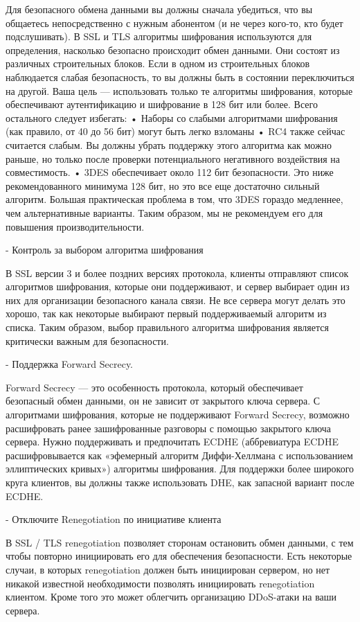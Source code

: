 \documentclass[10pt,a4paper]{article}
\begin{document}
Для безопасного обмена данными вы должны сначала убедиться, что вы общаетесь непосредственно с нужным абонентом (и не через кого-то, кто будет подслушивать). В SSL и TLS алгоритмы шифрования используются для определения, насколько безопасно происходит обмен данными. Они состоят из различных строительных блоков. Если в одном из строительных блоков наблюдается слабая безопасность, то вы должны быть в состоянии переключиться на другой.
Ваша цель — использовать только те алгоритмы шифрования, которые обеспечивают аутентификацию и шифрование в 128 бит или более. Всего остального следует избегать:
• Наборы со слабыми алгоритмами шифрования (как правило, от 40 до 56 бит) могут быть легко взломаны
• RC4 также сейчас считается слабым. Вы должны убрать поддержку этого алгоритма как можно раньше, но только после проверки потенциального негативного воздействия на совместимость.
• 3DES обеспечивает около 112 бит безопасности. Это ниже рекомендованного минимума 128 бит, но это все еще достаточно сильный алгоритм. Большая практическая проблема в том, что 3DES гораздо медленнее, чем альтернативные варианты. Таким образом, мы не рекомендуем его для повышения производительности.

- Контроль за выбором алгоритма шифрования

В SSL версии 3 и более поздних версиях протокола, клиенты отправляют список алгоритмов шифрования, которые они поддерживают, и сервер выбирает один из них для организации безопасного канала связи. Не все сервера могут делать это хорошо, так как некоторые выбирают первый поддерживаемый алгоритм из списка. Таким образом, выбор правильного алгоритма шифрования является критически важным для безопасности.

- Поддержка Forward Secrecy.

Forward Secrecy — это особенность протокола, который обеспечивает безопасный обмен данными, он не зависит от закрытого ключа сервера. С алгоритмами шифрования, которые не поддерживают Forward Secrecy, возможно расшифровать ранее зашифрованные разговоры с помощью закрытого ключа сервера. Нужно поддерживать и предпочитать ECDHE (аббревиатура ECDHE расшифровывается как «эфемерный алгоритм Диффи-Хеллмана с использованием эллиптических кривых») алгоритмы шифрования. Для поддержки более широкого круга клиентов, вы должны также использовать DHE, как запасной вариант после ECDHE.

- Отключите Renegotiation по инициативе клиента

В SSL / TLS renegotiation позволяет сторонам остановить обмен данными, с тем чтобы повторно инициировать его для обеспечения безопасности. Есть некоторые случаи, в которых renegotiation должен быть инициирован сервером, но нет никакой известной необходимости позволять инициировать renegotiation клиентом. Кроме того это может облегчить организацию DDoS-атаки на ваши сервера.
\end{document}
